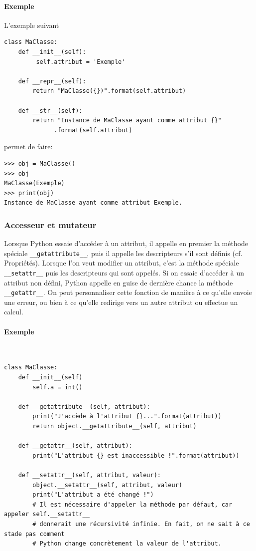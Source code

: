 \documentclass[a4paper, 10pt]{article}
\newcommand{\code}[1]{{\small\texttt{#1}}}
\begin{document}
\paragraph{Exemple} L'exemple suivant
\begin{verbatim}
class MaClasse:
    def __init__(self):
         self.attribut = 'Exemple'

    def __repr__(self):
        return "MaClasse({})".format(self.attribut)

    def __str__(self):
        return "Instance de MaClasse ayant comme attribut {}"
              .format(self.attribut)
\end{verbatim}
permet de faire:
\begin{Verbatim}[fontsize = \footnotesize, frame = single]
>>> obj = MaClasse()
>>> obj
MaClasse(Exemple)
>>> print(obj)
Instance de MaClasse ayant comme attribut Exemple.
\end{Verbatim}

\subsubsection{Accesseur et mutateur}
Lorsque Python essaie d'accéder à un attribut, il appelle en premier la méthode spéciale \code{\_\_getattribute\_\_}\index{\code{\_\_getattribute\_\_}}, puis il appelle les descripteurs s'il sont définis (cf. Propriétés). Lorsque l'on veut modifier un attribut, c'est la méthode spéciale \code{\_\_setattr\_\_}\index{\code{\_\_setattr\_\_}} puis les descripteurs qui sont appelés. Si on essaie d'accéder à un attribut non défini, Python appelle en guise de dernière chance la méthode \code{\_\_getattr\_\_}\index{\code{\_\_getattr\_\_}}. On peut personnaliser cette fonction de manière à ce qu'elle envoie une erreur, ou bien à ce qu'elle redirige vers un autre attribut ou effectue un calcul.

\paragraph{Exemple}~

\begin{verbatim}
class MaClasse:
    def __init__(self)
        self.a = int()

    def __getattribute__(self, attribut):
        print("J'accède à l'attribut {}...".format(attribut))
        return object.__getattribute__(self, attribut)

    def __getattr__(self, attribut):
        print("L'attribut {} est inaccessible !".format(attribut))

    def __setattr__(self, attribut, valeur):
        object.__setattr__(self, attribut, valeur)
        print("L'attribut a été changé !")
        # Il est nécessaire d'appeler la méthode par défaut, car appeler self.__setattr__ 
        # donnerait une récursivité infinie. En fait, on ne sait à ce stade pas comment
        # Python change concrètement la valeur de l'attribut.
\end{verbatim}
\end{document}
